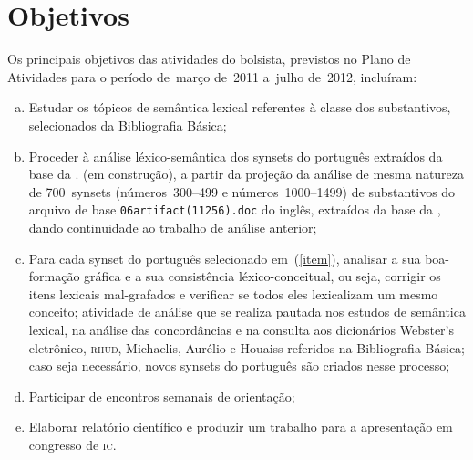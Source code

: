 \chapter{Objetivos}

Os principais objetivos das atividades do bolsista, previstos no Plano de
Atividades para o período de~março de~2011 a~julho de~2012, incluíram:

\begin{enumerate}[a.] \item Estudar os tópicos de semântica lexical referentes
      à classe dos substantivos, selecionados da Bibliografia Básica;

  \item\label{item} Proceder à análise léxico-semântica dos synsets do
    português extraídos da base da \wnbr. (em construção), a partir da projeção
    da análise de mesma natureza de 700~synsets (números~300--499 e
    números~1000--1499) de substantivos do arquivo de base
    \texttt{06artifact(11256).doc} do inglês, extraídos da base da \wnpr, dando
    continuidade ao trabalho de análise anterior;

  \item Para cada synset do português selecionado em~(\ref{item}), analisar a
    sua boa-formação gráfica e a sua consistência léxico-conceitual, ou seja,
    corrigir os itens lexicais mal-grafados e verificar se todos eles
    lexicalizam um mesmo conceito; atividade de análise que se realiza pautada
    nos estudos de semântica lexical, na análise das concordâncias e na
    consulta aos dicionários Webster's eletrônico, \textsc{rhud}, Michaelis,
    Aurélio e Houaiss referidos na Bibliografia Básica; caso seja necessário,
    novos synsets do português são criados nesse processo;

  \item Participar de encontros semanais de orientação;

  \item Elaborar relatório científico e produzir um trabalho para a
    apresentação em congresso de \textsc{ic}.
\end{enumerate}
